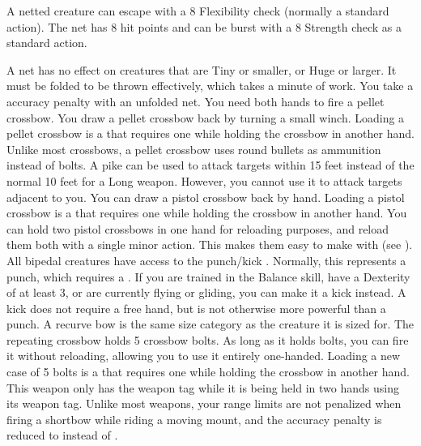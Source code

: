     \par A netted creature can escape with a  8 Flexibility check (normally a standard action). The net has 8 hit points and can be burst with a  8 Strength check as a standard action.
    \par A net has no effect on creatures that are Tiny or smaller, or Huge or larger. It must be folded to be thrown effectively, which takes a minute of work. You take a  accuracy penalty with an unfolded net.
     You need both hands to fire a pellet crossbow.
    You draw a pellet crossbow back by turning a small winch.
    Loading a pellet crossbow is a  that requires one  while holding the crossbow in another hand.
    Unlike most crossbows, a pellet crossbow uses round bullets as ammunition instead of bolts.
     A pike can be used to attack targets within 15 feet instead of the normal 10 feet for a Long weapon.
    However, you cannot use it to attack targets adjacent to you.
     You can draw a pistol crossbow back by hand.
    Loading a pistol crossbow is a  that requires one  while holding the crossbow in another hand.
    You can hold two pistol crossbows in one hand for reloading purposes, and reload them both with a single minor action.
    This makes them easy to make  with (see ).
     All bipedal creatures have access to the punch/kick .
    Normally, this represents a punch, which requires a .
    If you are trained in the Balance skill, have a Dexterity of at least 3, or are currently flying or gliding, you can make it a kick instead.
    A kick does not require a free hand, but is not otherwise more powerful than a punch.
     A recurve bow is the same size category as the creature it is sized for.
     The repeating crossbow holds 5 crossbow bolts.
    As long as it holds bolts, you can fire it without reloading, allowing you to use it entirely one-handed.
    Loading a new case of 5 bolts is a  that requires one  while holding the crossbow in another hand.
     This weapon only has the  weapon tag while it is being held in two hands using its  weapon tag.
     Unlike most  weapons, your range limits are not penalized when firing a shortbow while riding a moving mount, and the accuracy penalty is reduced to  instead of .
